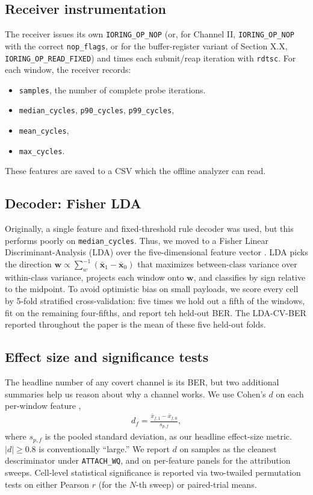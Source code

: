\documentclass[letterpaper,twocolumn,10pt]{article}
\newcommand{\code}[1]{\texttt{#1}}
\begin{document}
\subsection{Receiver instrumentation}
The receiver issues its own \code{IORING\_OP\_NOP} (or, for Channel II, \code{IORING\_OP\_NOP} with the correct \code{nop\_flags}, or for the buffer-register variant of Section X.X, \code{IORING\_OP\_READ\_FIXED}) and times each submit/reap iteration with \code{rdtsc}. For each window, the receiver records:%
\begin{itemize}
    \item \code{samples}, the number of complete probe iterations.
    \item \code{median\_cycles}, \code{p90\_cycles}, \code{p99\_cycles},
    \item \code{mean\_cycles},
    \item \code{max\_cycles}.
\end{itemize}
These features are saved to a CSV which the offline analyzer can read.

\subsection{Decoder: Fisher LDA}
Originally, a single feature and fixed-threshold rule decoder was used, but this performs poorly on \code{median\_cycles}. Thus, we moved to a Fisher Linear Discriminant-Analysis (LDA) over the five-dimensional feature vector \cite{fisher1936lda}. LDA picks the direction $\mathbf{w} \propto \sum_{w}^{-1} (\bar{\mathbf{x}}_1 - \bar{\mathbf{x}}_0)$ that maximizes between-class variance over within-class variance, projects each window onto $\mathbf{w}$, and classifies by sign relative to the midpoint. To avoid optimistic bias on small payloads, we score every cell by 5-fold stratified cross-validation: five times we hold out a fifth of the windows, fit on the remaining four-fifths, and report teh held-out BER. The LDA-CV-BER reported throughout the paper is the mean of these five held-out folds.

\subsection{Effect size and significance tests}
The headline number of any covert channel is its BER, but two additional summaries help us reason about why a channel works. We use Cohen's $d$ on each per-window feature \cite{cohen1988statistical},
\begin{align*}
    d_f = \frac{\bar{x}_{f,1} - \bar{x}_{f,0}}{s_{p,f}},
\end{align*}
where $s_{p,f}$ is the pooled standard deviation, as our headline effect-size metric. $|d| \geq 0.8$ is conventionally ``large.'' We report $d$ on samples as the cleanest descriminator under \code{ATTACH\_WQ}, and on per-feature panels for the attribution sweeps. Cell-level statistical significance is reported via two-twailed permutation tests on either Pearson $r$ (for the $N$-th sweep) or paired-trial means.
\end{document}
